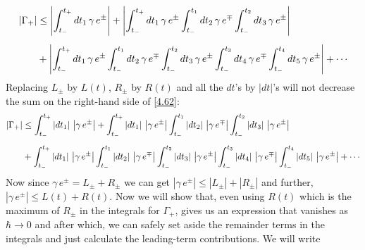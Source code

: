 \documentclass[12pt,a4paper]{article}
\begin{document}
	\begin{align}
		\left| \Gamma_{+} \right| &\leq \left| \int_{t_{-}}^{t_{+}} dt_{1}\, \gamma\, e^{\pm} \right| + \left| \int_{t_{-}}^{t_{+}} dt_{1}\, \gamma\, e^{\pm} \int_{t_{-}}^{t_{1}} dt_{2}\, \gamma\, e^{\mp} \int_{t_{-}}^{t_{2}} dt_{3}\, \gamma\, e^{\pm} \right| \notag \\[5pt]
		&+ \left| \int_{t_{-}}^{t_{+}} dt_{1}\, \gamma\, e^{\pm} \int_{t_{-}}^{t_{1}} dt_{2}\, \gamma\, e^{\mp} \int_{t_{-}}^{t_{2}} dt_{3}\, \gamma\, e^{\pm} \int_{t_{-}}^{t_{3}} dt_{4}\, \gamma\, e^{\mp} \int_{t_{-}}^{t_{4}} dt_{5}\, \gamma\, e^{\pm} \right| + \cdots \label{4.62}
	\end{align}
	Replacing $L_{\pm}$ by $L(t)$, $R_{\pm}$ by $R(t)$ and all the $dt$'s by $\left| dt \right|$'s will not decrease the sum on the right-hand side of \eqref{4.62}:
	\begin{align}
		\left| \Gamma_{+} \right| &\leq \int_{t_{-}}^{t_{+}} \left| dt_{1} \right|\, \left| \gamma\, e^{\pm} \right| + \int_{t_{-}}^{t_{+}} \left| dt_{1} \right|\, \left| \gamma\, e^{\pm} \right| \int_{t_{-}}^{t_{1}} \left| dt_{2} \right|\, \left| \gamma\, e^{\mp} \right| \int_{t_{-}}^{t_{2}} \left| dt_{3} \right|\, \left| \gamma\, e^{\pm} \right| \notag \\[5pt]
		&+ \int_{t_{-}}^{t_{+}} \left| dt_{1} \right|\, \left| \gamma\, e^{\pm} \right| \int_{t_{-}}^{t_{1}} \left| dt_{2} \right|\, \left| \gamma\, e^{\mp} \right| \int_{t_{-}}^{t_{2}} \left| dt_{3} \right|\, \left| \gamma\, e^{\pm} \right| \int_{t_{-}}^{t_{3}} \left| dt_{4} \right|\, \left| \gamma\, e^{\mp} \right| \int_{t_{-}}^{t_{4}} \left| dt_{5} \right|\, \left| \gamma\, e^{\pm} \right| + \cdots \label{4.63}
	\end{align}
	Now since $\gamma\, e^{\pm} = L_{\pm} + R_{\pm}$ we can get $\left| \gamma\, e^{\pm} \right| \leq \left| L_{\pm} \right| + \left| R_{\pm} \right|$ and further, $\left| \gamma\, e^{\pm} \right| \leq L(t) + R(t)$. Now we will show that, even using $R(t)$ which is the maximum of $R_{\pm}$ in the integrals for $\Gamma_{+}$, gives us an expression that vanishes as $\hbar \rightarrow 0$ and after which, we can safely set aside the remainder terms in the integrals and just calculate the leading-term contributions. We will write
\end{document}
